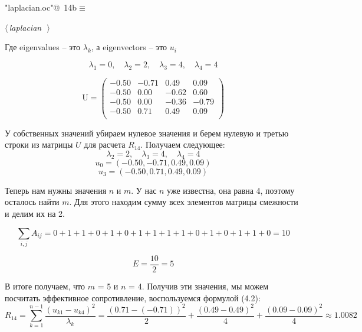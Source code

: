 \documentclass{article}
\begin{document}
\begin{flushleft} \small
\begin{minipage}{\linewidth}\label{scrap19}\raggedright\small
{} \verb@"laplacian.oc"@\nobreak\ {\footnotesize {14b}}$\equiv$
\vspace{-1ex}
\begin{list}{}{} \item
\mbox{}\verb@@\hbox{$\langle\,${\itshape laplacian}\nobreak\ {\footnotesize {}}$\,\rangle$}\verb@@{\NWsep}
\end{list}
\vspace{-1.5ex}
\footnotesize
\begin{list}{}{\setlength{\itemsep}{-\parsep}\setlength{\itemindent}{-\leftmargin}}

\item{}
\end{list}
\end{minipage}\vspace{4ex}
\end{flushleft}
Где eigenvalues – это \(\lambda_k\), а eigenvectors –  это  \(u_{i}\)

$$\lambda_1 = 0, \quad \lambda_2 = 2, \quad \lambda_3 = 4, \quad \lambda_4 = 4$$

\[
\text{U} =  \begin{pmatrix} 
-0.50 & -0.71 & 0.49 & 0.09 \\
-0.50 & 0.00 & -0.62 & 0.60 \\
-0.50 & 0.00 & -0.36 & -0.79 \\
-0.50 & 0.71 & 0.49 & 0.09 \\
\end{pmatrix} 
\]



У собственных значений убираем нулевое значения и берем нулевую и третью строки из матрицы \(U\) для расчета \(R_{14}\). Получаем следующее:
$$ \lambda_2 = 2, \quad \lambda_3 = 4, \quad \lambda_4 = 4 $$
$$ u_0  = (-0.50, -0.71, 0.49, 0.09)$$
$$ u_3  = (-0.50, 0.71, 0.49, 0.09)$$

Теперь нам нужны значения \(n\) и \(m\). У нас \(n\) уже известна, она равна 4, поэтому осталось найти \(m\). Для этого находим сумму всех элементов матрицы смежности и делим их на 2.

$$ \sum_{i,j} A_{ij} = 0 + 1 + 1 + 0 + 1 + 0 + 1 + 1 + 1 + 1 + 0 + 1 + 0 + 1 + 1 + 0 = 10$$

$$ E = \frac{10}{2} = 5$$

В итоге получаем, что \(m\) = 5 и \(n\) = 4. Получив эти значения, мы можем посчитать эффективное сопротивление, воспользуемся формулой (4.2):
$$ R_{14} = \sum_{k=1}^{n-1} \frac{(u_{k1} - u_{k4})^2}{\lambda_k} = \frac{(0.71 - (-0.71))^2}{2} + \frac{(0.49 - 0.49)^2}{4} + \frac{(0.09 - 0.09)^2}{4} \approx 1.0082$$
\end{document}
